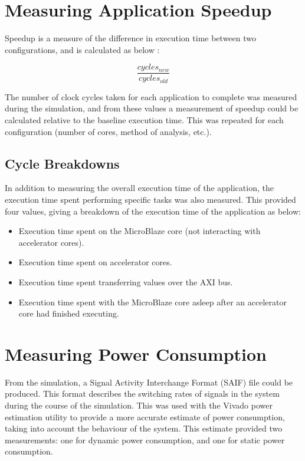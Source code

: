\documentclass{UoYCSproject}
\begin{document}
\section{Measuring Application Speedup}

Speedup is a measure of the difference in execution time between two configurations, and is calculated as below
\cite{computer-arch}:

\[\frac{cycles_{new}}{cycles_{old}}\]

The number of clock cycles taken for each application to complete was measured during the simulation, and from these
values a measurement of speedup could be calculated relative to the baseline execution time. This was repeated for
each configuration (number of cores, method of analysis, etc.).

\subsection{Cycle Breakdowns}

In addition to measuring the overall execution time of the application, the execution time spent performing
specific tasks was also measured.
This provided four values, giving a breakdown of the execution time of the application as below:

\begin{itemize}
  \item Execution time spent on the MicroBlaze core (not interacting with accelerator cores).
  \item Execution time spent on accelerator cores.
  \item Execution time spent transferring values over the AXI bus.
  \item Execution time spent with the MicroBlaze core asleep after an accelerator core had finished executing.
\end{itemize}

\section{Measuring Power Consumption}

From the simulation, a Signal Activity Interchange Format (SAIF) file could be produced. This format describes the
switching rates of signals in the system during the course of the simulation. This was used with the Vivado
power estimation utility to provide a more accurate estimate of power consumption, taking into account the behaviour
of the system. This estimate provided two measurements: one for dynamic power consumption, and one for static power consumption.
\end{document}
